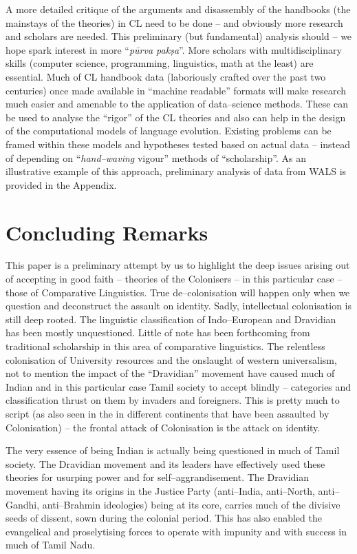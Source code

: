 A more detailed critique of the arguments and disassembly of the handbooks (the mainstays of the theories) in CL need to be done – and obviously more research and scholars are needed. This preliminary (but fundamental) analysis should – we hope spark interest in more “\textit{pūrva pakṣa}”. More scholars with multidisciplinary skills (computer science, programming, linguistics, math at the least) are essential. Much of CL handbook data (laboriously crafted over the past two centuries) once made available in “machine readable” formats will make research much easier and amenable to the application of data–science methods. These can be used to analyse the “rigor” of the CL theories and also can help in the design of the computational models of language evolution. Existing problems can be framed within these models and hypotheses tested based on actual data – instead of depending on “\textit{hand–waving} vigour” methods of “scholarship”. As an illustrative example of this approach, preliminary analysis of data from WALS is provided in the Appendix.


\section*{Concluding Remarks}

This paper is a preliminary attempt by us to highlight the deep issues arising out of accepting in good faith – theories of the Colonisers – in this particular case – those of Comparative Linguistics. True de–colonisation will happen only when we question and deconstruct the assault on identity. Sadly, intellectual colonisation is still deep rooted. The linguistic classification of Indo–European and Dravidian has been mostly unquestioned. Little of note has been forthcoming from traditional scholarship in this area of comparative linguistics. The relentless colonisation of University resources and the onslaught of western universalism, not to mention the impact of the “Dravidian” movement have caused much of Indian and in this particular case Tamil society to accept blindly – categories and classification thrust on them by invaders and foreigners. This is pretty much to script (as also seen in the in different continents that have been assaulted by Colonisation) – the frontal attack of Colonisation is the attack on identity.

The very essence of being Indian is actually being questioned in much of Tamil society. The Dravidian movement and its leaders have effectively used these theories for usurping power and for self–aggrandisement. The Dravidian movement having its origins in the Justice Party (anti–India, anti–North, anti–Gandhi, anti–Brahmin ideologies) being at its core, carries much of the divisive seeds of dissent, sown during the colonial period. This has also enabled the evangelical and proselytising forces to operate with impunity and with success in much of Tamil Nadu.

